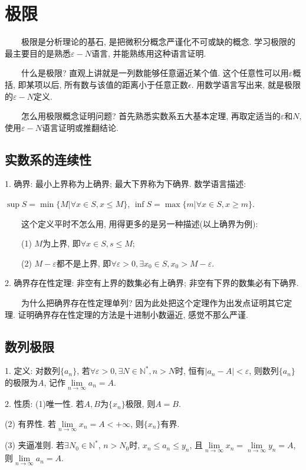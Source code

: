 \section{极限}

\begin{tcolorbox}[colback=red!5,colframe=red!75!black]
~~~~极限是分析理论的基石, 是把微积分概念严谨化不可或缺的概念. 学习极限的最主要目的是熟悉$\varepsilon-N$语言, 并能熟练用这种语言证明.

~~~~什么是极限? 直观上讲就是一列数能够任意逼近某个值. 这个任意性可以用$\varepsilon$概括, 即某项以后, 所有数与该值的距离小于任意正数$\epsilon$. 
用数学语言写出来, 就是极限的$\varepsilon-N$定义.

~~~~怎么用极限概念证明问题? 首先熟悉实数系五大基本定理, 再取定适当的$\varepsilon$和$N$, 使用$\varepsilon-N$语言证明或推翻结论.

\end{tcolorbox}

\subsection{实数系的连续性}

1. 确界: 最小上界称为上确界; 最大下界称为下确界. 数学语言描述: 

$\sup S =\min\{M|\forall x \in S, x \leq M\}$, 
$\inf S =\max\{m|\forall x \in S, x \geq m\}$.

\begin{tcolorbox}[colback=yellow!10,colframe=red!75!black,title=小窍门]
 ~~~~这个定义平时不怎么用, 用得更多的是另一种描述(以上确界为例):

 ~~~~(1) $M$为上界, 即$\forall x \in S, s \leq M$;
 
 ~~~~(2) $M-\varepsilon$都不是上界, 即$\forall \varepsilon>0, \exists x_0 \in S, x_0>M-\varepsilon$.

\end{tcolorbox}

2. 确界存在性定理: 非空有上界的数集必有上确界; 非空有下界的数集必有下确界.

\begin{tcolorbox}[colback=gray!5,colframe=orange!75!black,title=注意事项]
~~~~为什么把确界存在性定理单列? 因为此处把这个定理作为出发点证明其它定理. 证明确界存在性定理的方法是十进制小数逼近, 感觉不那么严谨.
\end{tcolorbox}

\subsection{数列极限}

1. 定义: 对数列$\{a_n\}$, 若$\forall \varepsilon>0, \exists N \in \mathbb{N}^*, n>N$时, 恒有$|a_n-A|<\varepsilon$, 
则数列$\{a_n\}$的极限为$A$, 记作$\lim\limits_{n\rightarrow \infty} a_n=A$.

2. 性质: (1)唯一性. 若$A,B$为$\{x_n\}$极限, 则$A=B$.

(2) 有界性. 若$\lim\limits_{n\rightarrow \infty} x_n=A<+\infty$, 则$\{x_n\}$有界.

(3) 夹逼准则. 若$\exists N_0\in \mathbb{N}^*$, $n>N_0$时, $x_n\leq a_n\leq y_n$, 
且$\lim\limits_{n\rightarrow \infty} x_n=\lim\limits_{n\rightarrow \infty} y_n=A$, 
则$\lim\limits_{n\rightarrow \infty} a_n=A$. 

